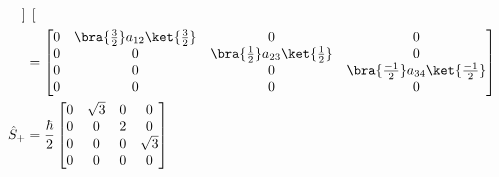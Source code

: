\documentclass{article}
\begin{document}
\begin{enumerate}
\begin{align}
\begin{bmatrix}
			\end{bmatrix} \\
			&=
			\begin{bmatrix}
				0 & \bra{\frac{3}{2}} a_{12} \ket{\frac{3}{2}} & 0 & 0 \\
				0 & 0 & \bra{\frac{1}{2}} a_{23} \ket{\frac{1}{2}} & 0 \\
				0 & 0 & 0 & \bra{\frac{-1}{2}} a_{34} \ket{\frac{-1}{2}} \\
				0 & 0 & 0 & 0 \\
			\end{bmatrix} \\
			\hat{S}_+ &= \frac{\hbar}{2}
			\begin{bmatrix}
				0 & \sqrt{3} & 0 & 0 \\
				0 & 0 & 2 & 0 \\
				0 & 0 & 0 & \sqrt{3} \\
				0 & 0 & 0 & 0 \\
			\end{bmatrix}
		\end{align}
		

\end{enumerate}
\end{document}

